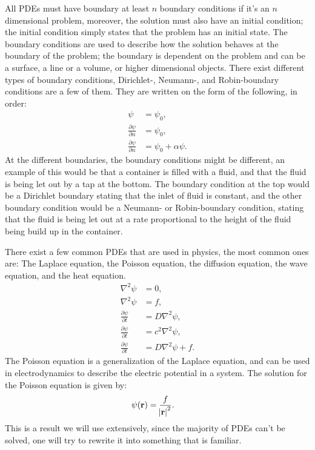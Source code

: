 \documentclass[a4paper]{article}
\newcommand{\laplace}{\nabla^2}
\newcommand{\fpartial}[2]{\frac{\partial #1}{\partial #2}}
\begin{document}
\vspace{0.5cm}\noindent
All PDEs must have boundary at least $n$ boundary conditions if it's an $n$ dimensional problem, moreover, the solution must also have an initial condition; the initial condition simply states that the problem has an initial state.
The boundary conditions are used to describe how the solution behaves at the boundary of the problem; the boundary is dependent on the problem and can be a surface, a line or a volume, or higher dimensional objects.
There exist different types of boundary conditions, Dirichlet-, Neumann-, and Robin-boundary conditions are a few of them. They are written on the form of the following, in order:
\begin{align*}
    \psi &= \psi_0,\\
    \frac{\partial \psi}{\partial n} &= \psi_0,\\
    \frac{\partial \psi}{\partial n} &= \psi_0 + \alpha\psi.
\end{align*}At the different boundaries, the boundary conditions might be different, an example of this would be that a container is filled with a fluid, and that the fluid is being let out by a tap at the bottom.
The boundary condition at the top would be a Dirichlet boundary stating that the inlet of fluid is constant, and the other boundary condition would be a Neumann- or Robin-boundary condition, stating that the fluid is being let out at a rate proportional to the height of the fluid being build up in the container.

\vspace*{0.5cm}\noindent
There exist a few common PDEs that are used in physics, the most common ones are: The Laplace equation, the Poisson equation, the diffusion equation, the wave equation, and the heat equation.
\begin{align*}
    \laplace \psi &= 0,\\
    \laplace \psi &= f,\\
    \fpartial{\psi}{t} &= D\laplace \psi,\\
    \fpartial{\psi}{t} &= c^2\laplace \psi,\\
    \fpartial{\psi}{t} &= D\laplace \psi + f.
\end{align*}The Poisson equation is a generalization of the Laplace equation, and can be used in electrodynamics to describe the electric potential in a system. The solution for the Poisson equation is given by:
\begin{align*}
    \psi(\mathbf{r}) &= \frac{f}{\abs{\mathbf{r}}^2}.
\end{align*}This is a result we will use extensively, since the majority of PDEs can't be solved, one will try to rewrite it into something that is familiar.
\end{document}
